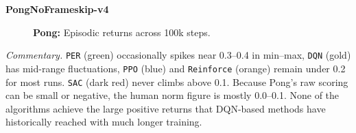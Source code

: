 \noindent
\textbf{PongNoFrameskip-v4}
\begin{figure} 
	\centering
	\quad
	\caption{\textbf{Pong:} Episodic returns across 100k steps.}
	\label{fig:pong_comparison_combined}
\end{figure}

\noindent
\emph{Commentary.}
\texttt{PER} (green) occasionally spikes near 0.3--0.4 in min--max, 
\texttt{DQN} (gold) has mid-range fluctuations, 
\texttt{PPO} (blue) and \texttt{Reinforce} (orange) remain under 0.2 for most runs. 
\texttt{SAC} (dark red) never climbs above 0.1. 
Because Pong’s raw scoring can be small or negative, 
the human norm figure is mostly 0.0--0.1. None of the algorithms achieve 
the large positive returns that DQN-based methods have historically 
reached with much longer training.

\bigskip

